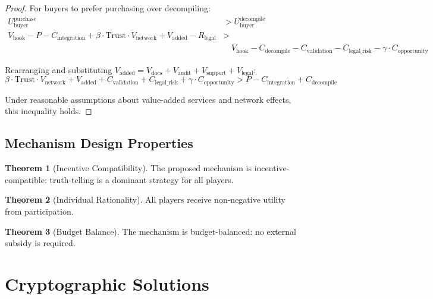 \documentclass[11pt,a4paper]{article}
\theoremstyle{definition}
\newtheorem{theorem}{Theorem}[section]
\theoremstyle{remark}
\newcommand{\hook}{\text{hook}}
\newcommand{\buyer}{\text{buyer}}
\begin{document}
\begin{proof}
For buyers to prefer purchasing over decompiling:
\begin{align}
U_{\buyer}^{\text{purchase}} &> U_{\buyer}^{\text{decompile}} \\
V_{\hook} - P - C_{\text{integration}} + \beta \cdot \text{Trust} \cdot V_{\text{network}} + V_{\text{added}} - R_{\text{legal}} &> \\
&\quad V_{\hook} - C_{\text{decompile}} - C_{\text{validation}} - C_{\text{legal\_risk}} - \gamma \cdot C_{\text{opportunity}}
\end{align}

Rearranging and substituting $V_{\text{added}} = V_{\text{docs}} + V_{\text{audit}} + V_{\text{support}} + V_{\text{legal}}$:
\begin{equation}
\beta \cdot \text{Trust} \cdot V_{\text{network}} + V_{\text{added}} + C_{\text{validation}} + C_{\text{legal\_risk}} + \gamma \cdot C_{\text{opportunity}} > P - C_{\text{integration}} + C_{\text{decompile}}
\end{equation}

Under reasonable assumptions about value-added services and network effects, this inequality holds.
\end{proof}

\subsection{Mechanism Design Properties}

\begin{theorem}[Incentive Compatibility]
The proposed mechanism is incentive-compatible: truth-telling is a dominant strategy for all players.
\end{theorem}

\begin{theorem}[Individual Rationality]
All players receive non-negative utility from participation.
\end{theorem}

\begin{theorem}[Budget Balance]
The mechanism is budget-balanced: no external subsidy is required.
\end{theorem}


\section{Cryptographic Solutions}
\label{sec:crypto}
\end{document}
